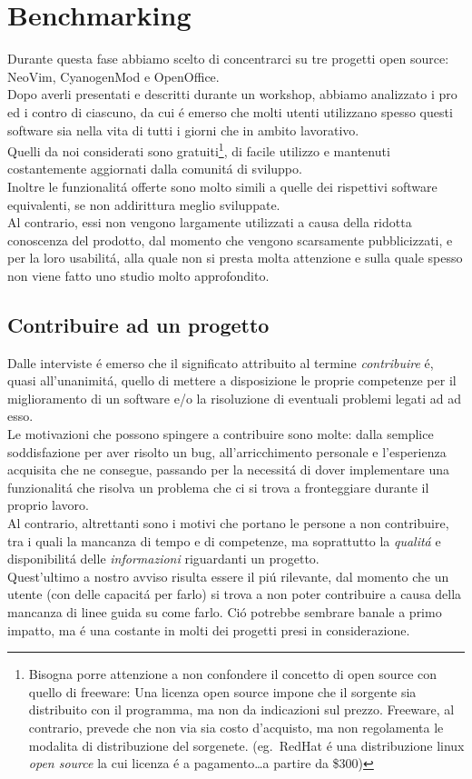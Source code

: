 \documentclass[12pt]{article} %
\begin{document}
\newpage

\section{Benchmarking}
Durante questa fase abbiamo scelto di concentrarci su tre progetti open source: NeoVim, CyanogenMod e OpenOffice.\\
Dopo averli presentati e descritti durante un workshop, abbiamo analizzato i pro ed i contro di ciascuno, da cui \'e emerso che molti utenti utilizzano spesso questi software sia nella vita di tutti i giorni che in ambito lavorativo.\\
Quelli da noi considerati sono gratuiti\footnote{Bisogna porre attenzione a non confondere il concetto di open source con quello di freeware: Una licenza open source impone che il sorgente sia distribuito con il programma, ma non da indicazioni sul prezzo. Freeware, al contrario, prevede che non via sia costo d'acquisto, ma non regolamenta le modalita di distribuzione del sorgenete. (eg.\ RedHat \'e una distribuzione linux \emph{open source} la cui licenza \'e a pagamento\dots a partire da \$300)}, di facile utilizzo e mantenuti costantemente aggiornati dalla comunit\'a di sviluppo.\\
Inoltre le funzionalit\'a offerte sono molto simili a quelle dei rispettivi software equivalenti, se non addirittura meglio sviluppate.\\
Al contrario, essi non vengono largamente utilizzati a causa della ridotta conoscenza del prodotto, dal momento che vengono scarsamente pubblicizzati, e per la loro usabilit\'a, alla quale non si presta molta attenzione e sulla quale spesso non viene fatto uno studio molto approfondito.\\

\subsection{Contribuire ad un progetto}
\label{motivi}
Dalle interviste \'e emerso che il significato attribuito al termine \emph{contribuire} \'e, quasi all'unanimit\'a, quello di mettere a disposizione le proprie competenze per il miglioramento di un software e/o la risoluzione di eventuali problemi legati ad ad esso.\\
Le motivazioni che possono spingere a contribuire sono molte: dalla semplice soddisfazione per aver risolto un bug, all'arricchimento personale e l'esperienza acquisita che ne consegue, passando per la necessit\'a di dover implementare una funzionalit\'a che risolva un problema che ci si trova a fronteggiare durante il proprio lavoro.\\
Al contrario, altrettanti sono i motivi che portano le persone a non contribuire, tra i quali la mancanza di tempo e di competenze, ma soprattutto la \emph{qualit\'a} e disponibilit\'a delle \emph{informazioni} riguardanti un progetto.\\
Quest'ultimo a nostro avviso risulta essere il pi\'u rilevante, dal momento che un utente (con delle capacit\'a per farlo) si trova a non poter contribuire a causa della mancanza di linee guida su come farlo. Ci\'o potrebbe sembrare banale a primo impatto, ma \'e una costante in molti dei progetti presi in considerazione.
\end{document}
